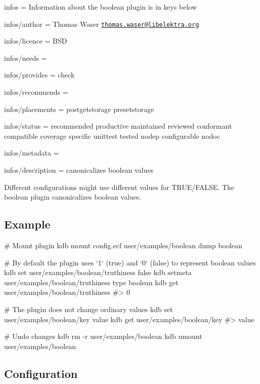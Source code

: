 
\begin{DoxyItemize}
\item infos = Information about the boolean plugin is in keys below
\item infos/author = Thomas Waser \href{mailto:thomas.waser@libelektra.org}{\tt thomas.\+waser@libelektra.\+org}
\item infos/licence = B\+SD
\item infos/needs =
\item infos/provides = check
\item infos/recommends =
\item infos/placements = postgetstorage presetstorage
\item infos/status = recommended productive maintained reviewed conformant compatible coverage specific unittest tested nodep configurable nodoc
\item infos/metadata =
\item infos/description = canonicalizes boolean values
\end{DoxyItemize}

Different configurations might use different values for {\ttfamily T\+R\+UE}/{\ttfamily F\+A\+L\+SE}. The {\ttfamily boolean} plugin canonicalizes boolean values.

\subsection*{Example}


\begin{DoxyCode}
# Mount plugin
kdb mount config.ecf user/examples/boolean dump boolean

# By default the plugin uses `1` (true) and `0` (false) to represent boolean values
kdb set user/examples/boolean/truthiness false
kdb setmeta user/examples/boolean/truthiness type boolean
kdb get user/examples/boolean/truthiness
#> 0

# The plugin does not change ordinary values
kdb set user/examples/boolean/key value
kdb get user/examples/boolean/key
#> value

# Undo changes
kdb rm -r user/examples/boolean
kdb umount user/examples/boolean
\end{DoxyCode}


\subsection*{Configuration}


